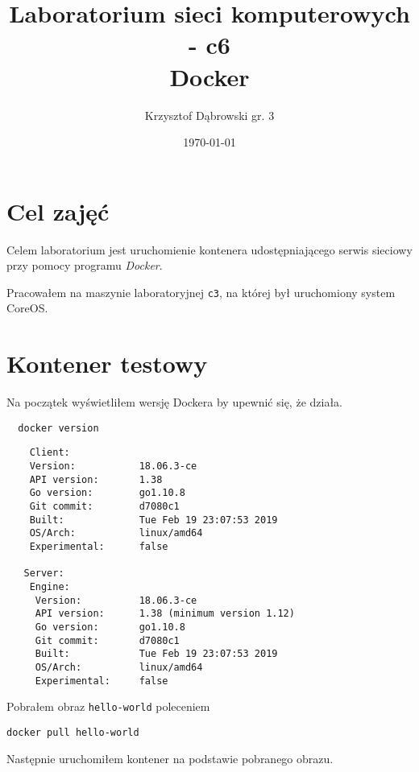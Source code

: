 \documentclass{article} %
\title{Laboratorium sieci komputerowych - c6 \\ Docker}
\author{Krzysztof Dąbrowski gr. 3}
\date{\today}
\begin{document}
\maketitle{}
\tableofcontents{}

\section{Cel zajęć}
Celem laboratorium jest uruchomienie kontenera udostępniającego serwis sieciowy przy pomocy programu \textit{Docker}.

Pracowałem na maszynie laboratoryjnej \texttt{c3}, na której był uruchomiony system CoreOS.

\section{Kontener testowy}
Na początek wyświetliłem wersję Dockera by upewnić się, że działa.

\begin{tcolorbox}[colback=yellow!10!white,colframe=red!45!black,coltitle=yellow!100!black, title=Sprawdzienie czy Docker działa]
  \begin{lstlisting}
  docker version
  \end{lstlisting}
  \tcblower
  \footnotesize
  \begin{lstlisting}
    Client: 
    Version:           18.06.3-ce
    API version:       1.38
    Go version:        go1.10.8
    Git commit:        d7080c1
    Built:             Tue Feb 19 23:07:53 2019
    OS/Arch:           linux/amd64
    Experimental:      false
   
   Server:
    Engine:
     Version:          18.06.3-ce
     API version:      1.38 (minimum version 1.12)
     Go version:       go1.10.8
     Git commit:       d7080c1
     Built:            Tue Feb 19 23:07:53 2019
     OS/Arch:          linux/amd64
     Experimental:     false 
  \end{lstlisting}
\end{tcolorbox}
\normalsize
\vspace{5mm}

\noindent{}Pobrałem obraz \texttt{hello-world} poleceniem
\begin{center}
  \texttt{docker pull hello-world}
\end{center}
Następnie uruchomiłem kontener na podstawie pobranego obrazu.
\end{document}
